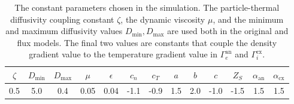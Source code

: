 \begin{table}[h] %
\centering
	\begin{tabular}{cccc|ccccccc|cc}
		$\zeta$ & $D_\text{min}$ & $D_\text{max}$ & $\mu$ & $\epsilon$ & $c_n$ & $c_T$ & $a$ & $b$ & $c$ & $Z_S$ & $\alpha_\text{an}$ & $\alpha_\text{cx}$ \\ \hline
		0.5 & 5.0 & 0.4 & 0.05 & 0.04 & -1.1 & -0.9 & 1.5 & 2.0 & -1.0 & -1.5 & 1.5 & 1.5
	\end{tabular}
	\caption{The constant parameters chosen in the simulation.
	The particle-thermal diffusivity coupling constant $\zeta$, the dynamic viscosity $\mu$, and the minimum and maximum diffusivity values $D_\text{min}, D_\text{max}$ are used both in the original and flux models.
	The final two values are constants that couple the density gradient value to the temperature gradient value in $\Gamma_e^\text{an}$ and $\Gamma_i^\text{cx}$.}
	\label{table:constants}
\end{table}


